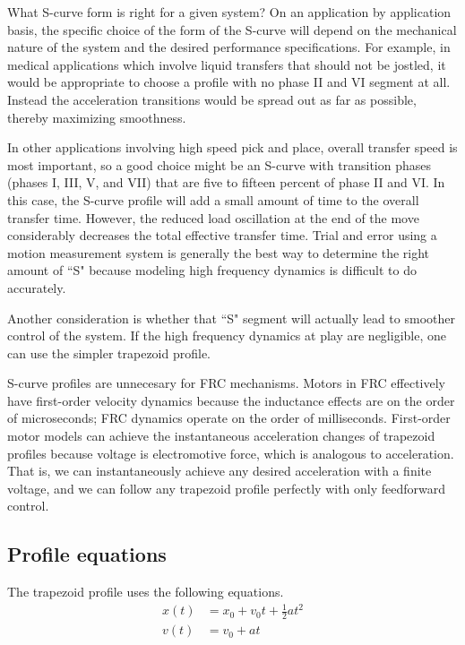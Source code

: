 What S-curve form is right for a given \gls{system}? On an application by
application basis, the specific choice of the form of the S-curve will depend on
the mechanical nature of the \gls{system} and the desired performance
specifications. For example, in medical applications which involve liquid
transfers that should not be jostled, it would be appropriate to choose a
profile with no phase II and VI segment at all. Instead the acceleration
transitions would be spread out as far as possible, thereby maximizing
smoothness.

In other applications involving high speed pick and place, overall transfer
speed is most important, so a good choice might be an S-curve with transition
phases (phases I, III, V, and VII) that are five to fifteen percent of phase II
and VI. In this case, the S-curve profile will add a small amount of time to the
overall transfer time. However, the reduced load oscillation at the end of the
move considerably decreases the total effective transfer time. Trial and error
using a motion measurement system is generally the best way to determine the
right amount of ``S" because modeling high frequency dynamics is difficult to
do accurately.

Another consideration is whether that ``S" segment will actually lead to
smoother control of the \gls{system}. If the high frequency dynamics at play are
negligible, one can use the simpler trapezoid profile.
\begin{remark}
  S-curve profiles are unnecesary for FRC mechanisms. Motors in FRC effectively
  have first-order velocity dynamics because the inductance effects are on the
  order of microseconds; FRC dynamics operate on the order of milliseconds.
  First-order motor models can achieve the instantaneous acceleration changes of
  trapezoid profiles because voltage is electromotive force, which is analogous
  to acceleration. That is, we can instantaneously achieve any desired
  acceleration with a finite voltage, and we can follow any trapezoid profile
  perfectly with only feedforward control.
\end{remark}

\subsection{Profile equations}

The trapezoid profile uses the following equations.
\begin{align*}
  x(t) &= x_0 + v_0t + \frac{1}{2}at^2 \\
  v(t) &= v_0 + at
\end{align*}

